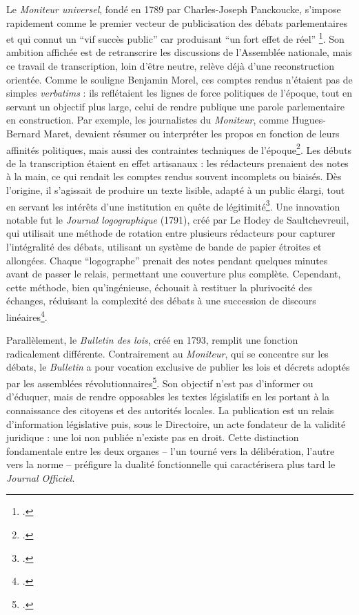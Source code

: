 Le \emph{Moniteur universel}, fondé en 1789 par Charles-Joseph Panckoucke, s’impose rapidement comme le premier vecteur de publicisation des débats parlementaires et qui connut un \enquote{vif succès public} car produisant \enquote{un fort effet de réel} \footcite[][]{coniez}. Son ambition affichée est de retranscrire les discussions de l’Assemblée nationale, mais ce travail de transcription, loin d’être neutre, relève déjà d’une reconstruction orientée. Comme le souligne Benjamin Morel, ces comptes rendus n’étaient pas de simples \emph{verbatims} : ils reflétaient les lignes de force politiques de l’époque, tout en servant un objectif plus large, celui de rendre publique une parole parlementaire en construction. Par exemple, les journalistes du \emph{Moniteur}, comme Hugues-Bernard Maret, devaient résumer ou interpréter les propos en fonction de leurs affinités politiques, mais aussi des contraintes techniques de l’époque\footcite[][]{coniez}. Les débuts de la transcription étaient en effet artisanaux : les rédacteurs prenaient des notes à la main, ce qui rendait les comptes rendus souvent incomplets ou biaisés. Dès l’origine, il s’agissait de produire un texte lisible, adapté à un public élargi, tout en servant les intérêts d’une institution en quête de légitimité\footcite[][]{morel}. Une innovation notable fut le \emph{Journal logographique} (1791), créé par Le Hodey de Saultchevreuil, qui utilisait une méthode de rotation entre plusieurs rédacteurs pour capturer l’intégralité des débats, utilisant un système de bande de papier étroites et allongées. Chaque \enquote{logographe} prenait des notes pendant quelques minutes avant de passer le relais, permettant une couverture plus complète. Cependant, cette méthode, bien qu’ingénieuse, échouait à restituer la plurivocité des échanges, réduisant la complexité des débats à une succession de discours linéaires\footcite[][]{coniez}.

Parallèlement, le \emph{Bulletin des lois}, créé en 1793, remplit une fonction radicalement différente. Contrairement au \emph{Moniteur}, qui se concentre sur les débats, le \emph{Bulletin} a pour vocation exclusive de publier les lois et décrets adoptés par les assemblées révolutionnaires\footcite[][]{saudrais}. Son objectif n’est pas d’informer ou d’éduquer, mais de rendre opposables les textes législatifs en les portant à la connaissance des citoyens et des autorités locales. La publication est un relais d’information législative puis, sous le Directoire, un acte fondateur de la validité juridique : une loi non publiée n’existe pas en droit. Cette distinction fondamentale entre les deux organes – l’un tourné vers la délibération, l’autre vers la norme – préfigure la dualité fonctionnelle qui caractérisera plus tard le \emph{Journal Officiel}. 

